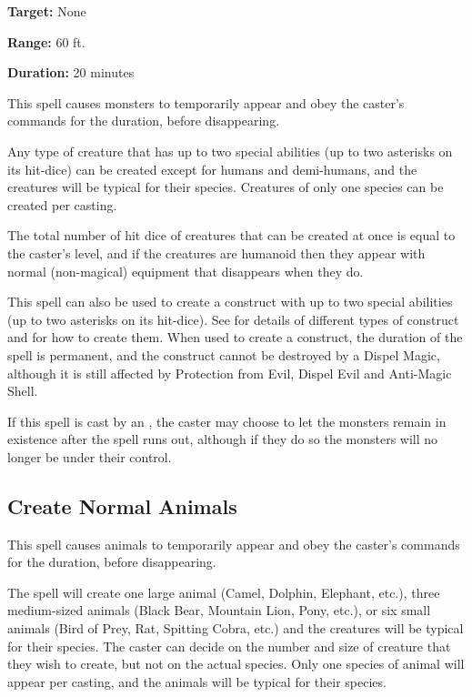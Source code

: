\begin{multicols*}{2}
{\textbf{Target:} None

\textbf{Range:} 60 ft.

\textbf{Duration:} 20 minutes}

This spell causes monsters to temporarily appear and obey the caster’s commands for the duration, before disappearing.

Any type of creature that has up to two special abilities (up to two asterisks on its hit-dice) can be created except for humans and demi-humans, and the creatures will be typical for their species. Creatures of only one species can be created per casting.

The total number of hit dice of creatures that can be created at once is equal to the caster’s level, and if the creatures are humanoid then they appear with normal (non-magical) equipment that disappears when they do.

This spell can also be used to create a construct with up to two special abilities (up to two asterisks on its hit-dice). See  for details of different types of construct and  for how to create them. When used to create a construct, the duration of the spell is permanent, and the construct cannot be destroyed by a Dispel Magic, although it is still affected by Protection from Evil, Dispel Evil and Anti-Magic Shell.

If this spell is cast by an , the caster may choose to let the monsters remain in existence after the spell runs out, although if they do so the monsters will no longer be under their control.

\subsection{Create Normal Animals}\label{spell:Create Normal Animals}

This spell causes animals to temporarily appear and obey the caster’s commands for the duration, before disappearing.

The spell will create one large animal (Camel, Dolphin, Elephant, etc.), three medium-sized animals (Black Bear, Mountain Lion, Pony, etc.), or six small animals (Bird of Prey, Rat, Spitting Cobra, etc.) and the creatures will be typical for their species. The caster can decide on the number and size of creature that they wish to create, but not on the actual species. Only one species of animal will appear per casting, and the animals will be typical for their species.


\end{multicols*}
